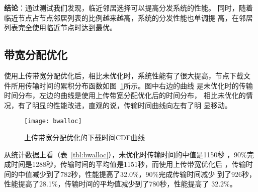 

%

\textbf{结论}：通过测试我们发现，临近邻居选择可以提高分发系统的性能。
同时，随着临近节点占节点邻居列表的比例越来越高，系统的分发性能也单调提
高，在邻居列表完全使用临近节点时达到最优。



\subsection{带宽分配优化}


使用上传带宽分配优化后，相比未优化时，系统性能有了很大提高，节点下载文
件所用传输时间的累积分布函数如图~\ref{fig:bwalloc}所示。图中右边的曲线
是未优化时的传输时间分布，左边的曲线是使用上传带宽分配优化后的时间分布，
相比未优化的情况，有了明显的性能改进，直观的说，传输时间曲线向左有了明
显移动。

\begin{figure}
  \centering
  \begin{minipage}{0.6\linewidth}
    \centering
    \texttt{[image: bwalloc]}
    \caption{上传带宽分配优化的下载时间CDF曲线}
    \label{fig:bwalloc}
  \end{minipage}
\end{figure}

从统计数据上看（表~\ref{tbl:bwalloc}），未优化时传输时间的中值是1150秒
，90\%完成时间是1288秒，传输时间的平均值是1151秒，而使用上传带宽优化后
，传输时间的中值减少到了782秒，性能提高了32.0\%，90\%完成传输时间减少
到了926秒，性能提高了28.1\%，传输时间的平均值减少到了780秒，性能提高了
32.2\%。

